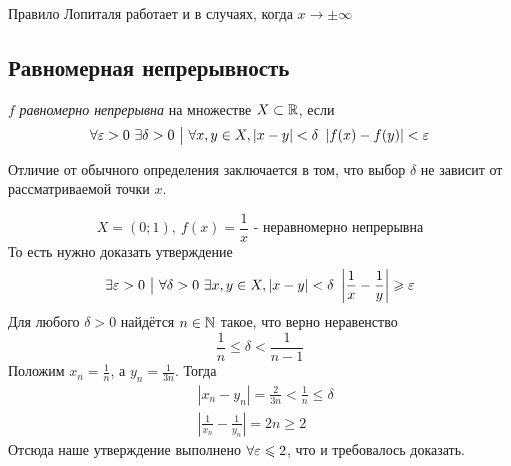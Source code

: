 \begin{note}
	Правило Лопиталя работает и в случаях, когда $x \to \pm \infty$
\end{note}

\subsection{Равномерная непрерывность}

\begin{definition}
	$f$ \textit{равномерно непрерывна} на множестве $X \subset \mathbb{R}$, если
	\[
		\forall \eps > 0\ \exists \delta > 0 \such \forall x, y \in X, |x - y| < \delta\ \left|f(x) - f(y)\right| < \eps
	\]
\end{definition}

\begin{note}
	Отличие от обычного определения заключается в том, что выбор $\delta$ не зависит от рассматриваемой точки $x$.
\end{note}

\begin{example}
	\[
		X = (0; 1),\ f(x) = \frac{1}{x} \text{ - неравномерно непрерывна}
	\]
	То есть нужно доказать утверждение
	\[
		\exists \varepsilon > 0 \ \big|\  \forall \delta > 0\ \exists x, y \in X, |x - y| < \delta\ \left|\frac{1}{x} - \frac{1}{y}\right| \geqslant \varepsilon
	\]
	Для любого $\delta > 0$ найдётся $n \in \mathbb{N}$ такое, что верно неравенство
	\[
		\frac{1}{n} \le \delta < \frac{1}{n - 1}
	\]
	Положим $x_n = \frac{1}{n}$, а $y_n = \frac{1}{3n}$. Тогда
	\begin{align*}
		&{|x_n - y_n| = \frac{2}{3n} < \frac{1}{n} \le \delta}
		\\
		&{\left|\frac{1}{x_n} - \frac{1}{y_n}\right| = 2n \ge 2}
	\end{align*}
	Отсюда наше утверждение выполнено $\forall \varepsilon \leqslant 2$, что и требовалось доказать.
\end{example}